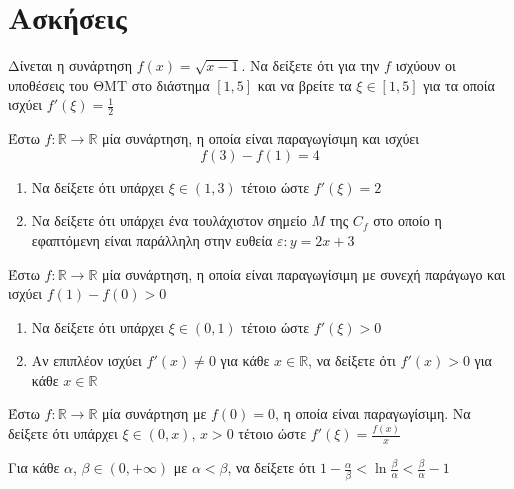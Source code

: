 \documentclass{presentation}
\begin{document}
\section{Ασκήσεις}
\begin{askisi}
    Δίνεται η συνάρτηση $f(x)=\sqrt{x-1}$. Να δείξετε ότι για την $f$ ισχύουν οι υποθέσεις του ΘΜΤ στο διάστημα $[1,5]$ και να βρείτε τα $ξ\in [1,5]$ για τα οποία ισχύει $f'(ξ)=\frac{1}{2}$

\end{askisi}

\begin{askisi}
    Έστω $f:\mathbb{R}\to\mathbb{R}$ μία συνάρτηση, η οποία είναι παραγωγίσιμη και ισχύει
    $$f(3)-f(1)=4$$
    \begin{enumerate}
        \item<1-> Να δείξετε ότι υπάρχει $ξ\in (1,3)$ τέτοιο ώστε $f'(ξ)=2$
        \item<2-> Να δείξετε ότι υπάρχει ένα τουλάχιστον σημείο $Μ$ της $C_f$ στο οποίο η εφαπτόμενη είναι παράλληλη στην ευθεία $ε:y=2x+3$
    \end{enumerate}

\end{askisi}

\begin{askisi}
    Έστω $f:\mathbb{R}\to\mathbb{R}$ μία συνάρτηση, η οποία είναι παραγωγίσιμη με συνεχή παράγωγο και ισχύει $f(1)-f(0)>0$
    \begin{enumerate}
        \item<1-> Να δείξετε ότι υπάρχει $ξ\in (0,1)$ τέτοιο ώστε $f'(ξ)>0$
        \item<2-> Αν επιπλέον ισχύει $f'(x)\ne 0$ για κάθε $x\in\mathbb{R}$, να δείξετε ότι $f'(x)>0$ για κάθε $x\in\mathbb{R}$
    \end{enumerate}

\end{askisi}

\begin{askisi}
    Έστω $f:\mathbb{R}\to\mathbb{R}$ μία συνάρτηση με $f(0)=0$, η οποία είναι παραγωγίσιμη. Να δείξετε ότι υπάρχει $ξ\in (0,x)$, $x>0$ τέτοιο ώστε $f'(ξ)=\frac{f(x)}{x}$

\end{askisi}

\begin{askisi}
    Για κάθε $α$, $β\in (0,+\infty)$ με $α<β$, να δείξετε ότι $1-\frac{α}{β}<\ln \frac{β}{α}<\frac{β}{α}-1$

\end{askisi}
\end{document}
